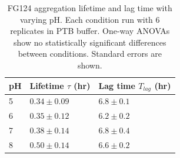 \begin{table}[b!]
  \caption{FG124 aggregation lifetime and lag time with varying pH. Each condition run with 6 replicates in PTB buffer.  One-way ANOVAs show no statistically significant differences between conditions.  Standard errors are shown.}
    \label{table:FG124-pH}
    \begin{tabular}{p{1cm}p{3cm}p{3cm}}
      pH & Lifetime $\tau$ (hr) & Lag time $T_{lag}$ (hr) \\
      \hline
      5 & $0.34 \pm 0.09$ & $6.8 \pm 0.1$ \\
      6 & $0.35 \pm 0.12$ & $6.2 \pm 0.2$ \\
      7 & $0.38 \pm 0.14$ & $6.8 \pm 0.4$ \\
      8 & $0.50 \pm 0.14$ & $6.6 \pm 0.2$ \\
    \end{tabular}
\end{table}
